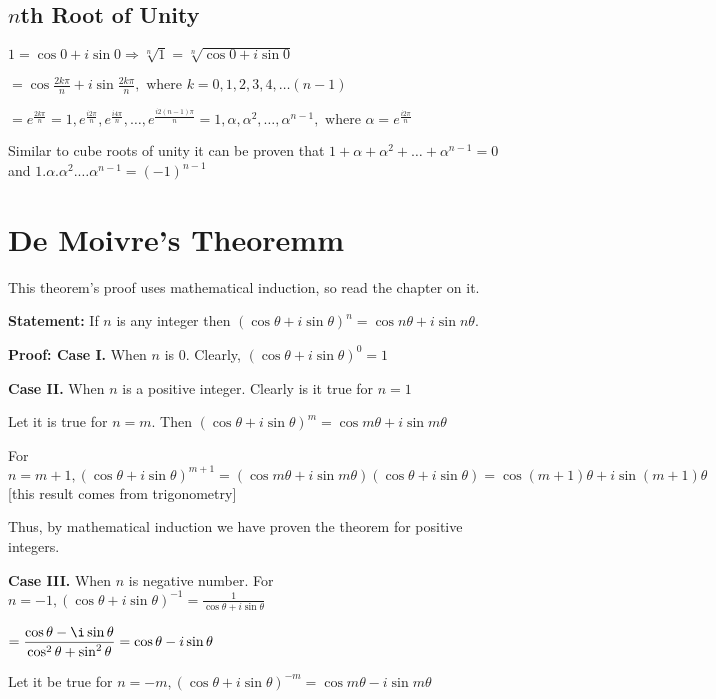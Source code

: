 \subsection{$n$th Root of Unity}
$1 = \cos0 + i\sin 0 \Rightarrow \sqrt[n]{1} = \sqrt[n]{\cos0 + i\sin0}$

\noindent $=\cos\frac{2k\pi}{n} + i\sin\frac{2k\pi}{n}, \text{~where~} k = 0, 1, 2, 3, 4, \ldots (n - 1)$

\noindent $= e^{\frac{2k\pi}{n}} = 1, e^{\frac{i2\pi}{n}}, e^{\frac{i4\pi}{n}}, \ldots, e^{\frac{i2(n - 1)\pi}{n}} = 1, \alpha, \alpha^2,
\ldots, \alpha^{n - 1}, \text{~where~}\alpha = e^{\frac{i2\pi}{n}}$

\noindent Similar to cube roots of unity it can be proven that $1 + \alpha + \alpha^2 + \ldots + \alpha^{n - 1} = 0$
and $1.\alpha.\alpha^2.\ldots\alpha^{n - 1} = (-1)^{n - 1}$

\section{De Moivre's Theoremm}
This theorem's proof uses mathematical induction, so read the chapter on it.

\noindent\textbf{Statement:} If $n$ is any integer then $(\cos\theta + i\sin\theta)^n = \cos n\theta + i\sin n\theta$.

\noindent\textbf{Proof: Case I.} When $n$ is $0$. Clearly, $(\cos\theta + i\sin\theta)^0 = 1$

\noindent\textbf{Case II.} When $n$ is a positive integer. Clearly is it true for $n = 1$

\noindent Let it is true for $n = m$. Then $(\cos\theta + i\sin\theta)^m = \cos m\theta + i\sin m\theta$

\noindent For $n = m + 1, (\cos\theta + i\sin\theta)^{m + 1} = (\cos m\theta + i\sin m\theta)(\cos\theta + i\sin\theta) = \cos(m + 1)\theta +
i\sin(m + 1)\theta$ [this result comes from trigonometry]

\noindent Thus, by mathematical induction we have proven the theorem for positive integers.

\noindent\textbf{Case III.} When $n$ is negative number. For $n = -1, (\cos\theta + i\sin\theta)^{-1} = \frac{1}{\cos\theta +
  i\sin\theta}$

\noindent $= \frac{\cos\theta - \i\sin\theta}{\cos^2\theta + \sin^2\theta} = \cos\theta - i\sin\theta$

\noindent Let it be true for $n = -m, (\cos\theta + i\sin\theta)^{-m} = \cos m\theta - i\sin m\theta$

